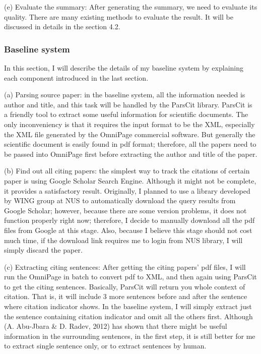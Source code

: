 \documentclass[hyp]{socreport}
\begin{document}
(e) Evaluate the summary: After generating the summary, we need to
evaluate its quality. There are many existing methods 
to evaluate the result. It will be discussed in details in the section
4.2. 

\subsubsection{Baseline system}

In this section, I will describe the details of my baseline system by
explaining each component introduced in the last section. 


(a) Parsing source paper: in the baseline system, all the information
needed is author and title, and this task will be handled by 
the ParsCit library. ParsCit is a friendly tool to extract some useful
information for scientific documents. The only inconveniency 
is that it requires the input format to be the XML, especially the XML
file generated by the OmniPage commercial software. But generally 
the scientific document is easily found in pdf format; therefore, all
the papers need to be passed into OmniPage first before extracting 
the author and title of the paper.

(b) Find out all citing papers: the simplest way to track the
citations of certain paper is using Google Scholar Search Engine.
Although 
it might not be complete, it provides a satisfactory result.
Originally, I planned to use a library developed by WING group at NUS
to 
automatically download the query results from Google Scholar; however,
because there are some version problems, it does not function properly 
right now; therefore, I decide to manually download all the pdf files
from Google at this stage. Also, because I believe this stage should
not 
cost much time, if the download link requires me to login from NUS
library, I will simply discard the paper.

(c) Extracting citing sentences: After getting the citing papers’ pdf
files, I will run the OmniPage in batch to convert pdf to XML, and
then 
again using ParsCit to get the citing sentences. Basically, ParsCit
will return you whole context of citation. That is, it will include 3
more 
sentences before and after the sentence where citation indicator
shows. In the baseline system, I will simply extract just the sentence
containing 
citation indicator and omit all the others first. Although (A.
Abu-Jbara \& D. Radev, 2012) has shown that there might be useful
information in the 
surrounding sentences, in the first step, it is still better for me to
extract single sentence only, or to extract sentences by human.
\end{document}
